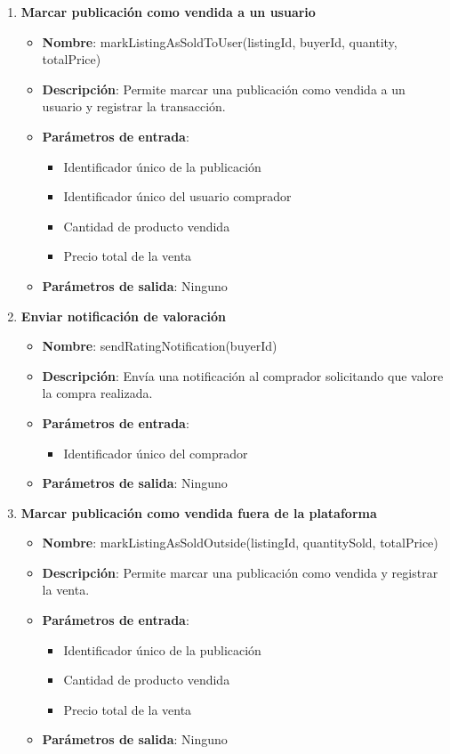 \begin{enumerate}[label=SOP-\protect\twodigits{\arabic*}:, align=left, leftmargin=*]
\item \textbf{Marcar publicación como vendida a un usuario}
\begin{itemize}
\item \textbf{Nombre}: markListingAsSoldToUser(listingId, buyerId, quantity, totalPrice)
\item \textbf{Descripción}: Permite marcar una publicación como vendida a un usuario y registrar la transacción.
\item \textbf{Parámetros de entrada}:
\begin{itemize}
\item Identificador único de la publicación
\item Identificador único del usuario comprador
\item Cantidad de producto vendida
\item Precio total de la venta
\end{itemize}
\item \textbf{Parámetros de salida}: Ninguno
\end{itemize}

\item \textbf{Enviar notificación de valoración}
\begin{itemize}
\item \textbf{Nombre}: sendRatingNotification(buyerId)
\item \textbf{Descripción}: Envía una notificación al comprador solicitando que valore la compra realizada.
\item \textbf{Parámetros de entrada}:
\begin{itemize}
\item Identificador único del comprador
\end{itemize}
\item \textbf{Parámetros de salida}: Ninguno
\end{itemize}

\item \textbf{Marcar publicación como vendida fuera de la plataforma}
\begin{itemize}
\item \textbf{Nombre}: markListingAsSoldOutside(listingId, quantitySold, totalPrice)
\item \textbf{Descripción}: Permite marcar una publicación como vendida y registrar la venta.
\item \textbf{Parámetros de entrada}:
\begin{itemize}
\item Identificador único de la publicación
\item Cantidad de producto vendida
\item Precio total de la venta
\end{itemize}
\item \textbf{Parámetros de salida}: Ninguno
\end{itemize}


\end{enumerate}
